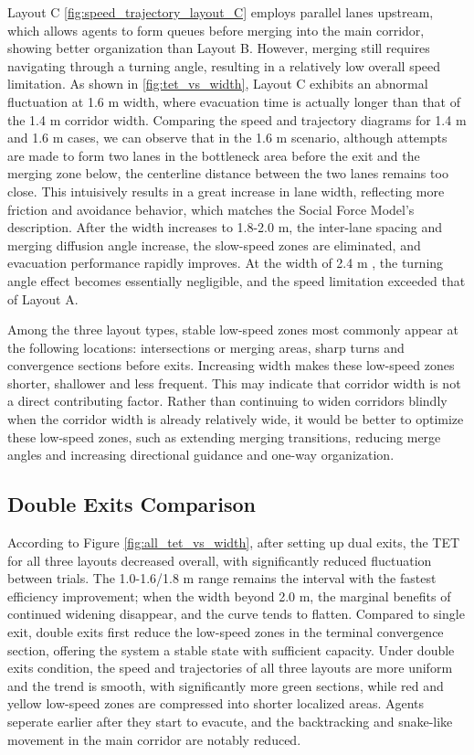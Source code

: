 Layout C \ref{fig:speed_trajectory_layout_C} employs parallel lanes upstream, which allows agents to form queues before merging into the main corridor, showing better organization than Layout B. However, merging still requires navigating through a turning angle, resulting in a relatively low overall speed limitation. As shown in \ref{fig:tet_vs_width}, Layout C exhibits an abnormal fluctuation at 1.6 m width, where evacuation time is actually longer than that of the 1.4 m corridor width. Comparing the speed and trajectory diagrams for 1.4 m and 1.6 m cases, we can observe that in the 1.6 m scenario, although attempts are made to form two lanes in the bottleneck area before the exit and the merging zone below, the centerline distance between the two lanes remains too close. This intuisively results in a great increase in lane width, reflecting more friction and avoidance behavior, which matches the Social Force Model's description. After the width increases to 1.8-2.0 m, the inter-lane spacing and merging diffusion angle increase, the slow-speed zones are eliminated, and evacuation performance rapidly improves. At the width of 2.4 m , the turning angle effect becomes essentially negligible, and the speed limitation exceeded that of Layout A.

Among the three layout types, stable low-speed zones most commonly appear at the following locations: intersections or merging areas, sharp turns and convergence sections before exits. Increasing width makes these low-speed zones shorter, shallower and less frequent. This may indicate that corridor width is not a direct contributing factor. Rather than continuing to widen corridors blindly when the corridor width is already relatively wide, it would be better to optimize these low-speed zones, such as extending merging transitions, reducing merge angles and increasing directional guidance and one-way organization.

\subsection{Double Exits Comparison}
According to Figure \ref{fig:all_tet_vs_width}, after setting up dual exits, the TET for all three layouts decreased overall, with significantly reduced fluctuation between trials. The 1.0-1.6/1.8 m range remains the interval with the fastest efficiency improvement; when the width beyond 2.0 m, the marginal benefits of continued widening disappear, and the curve tends to flatten. Compared to single exit, double exits first reduce the low-speed zones in the terminal convergence section, offering the system a stable state with sufficient capacity. Under double exits condition, the speed and trajectories of all three layouts are more uniform and the trend is smooth, with significantly more green sections, while red and yellow low-speed zones are compressed into shorter localized areas. Agents seperate earlier after they start to evacute, and the backtracking and snake-like movement in the main corridor are notably reduced.

